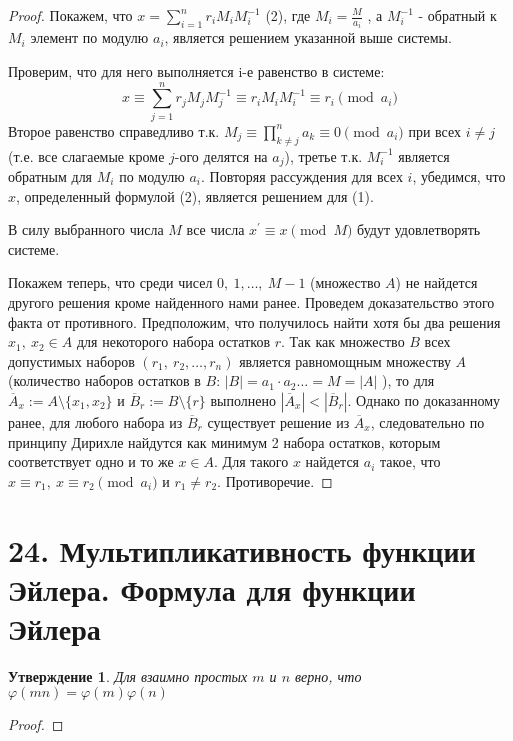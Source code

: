 \documentclass[a4paper,12pt]{article}
\newtheorem*{Statements}{Утверждение}
\renewcommand{\phi}{\varphi}
\newcommand{\p}{^{\prime}}
\begin{document}
        \begin{proof}
            Покажем, что $ x=\sum _{i=1}^{n}r_{i}M_{i}M_{i}^{-1}$ (2),
            где $ M_{i}={\frac {M}{a_{i}}}$ , а $ M_{i}^{-1} $  - обратный к $ M_{i}$  элемент по модулю $a_{i}$, является решением указанной выше системы.

            Проверим, что для него выполняется i-е равенство в системе:
            $$ x\equiv \sum _{j=1}^{n} r_{j} M_{j} M_{j}^{-1}
                \equiv r_{i}M_{i} M_{i}^{-1}
                \equiv r_{i}{\pmod {a_{i}}} $$
            Второе равенство справедливо т.к.
            $ M_{j}\equiv \prod_{k\neq j}^{n} a_{k}
                    \equiv 0{\pmod {a_{i}}}$
            при всех $ i\neq j$ (т.е. все слагаемые кроме $j$-ого делятся на $a_j$), третье т.к. $ M_{i}^{-1} $ является обратным для $ M_{i} $ по модулю $a_{i} $. Повторяя рассуждения для всех $i$, убедимся, что $x$, определенный формулой (2), является решением для (1).

            В силу выбранного числа $M$ все числа $x\p\equiv x{\pmod  M}$ будут удовлетворять системе.

            Покажем теперь, что среди чисел $0,\ 1, \dots,\ M-1$ (множество $A$) не найдется другого решения кроме найденного нами ранее.
            Проведем доказательство этого факта от противного.
            Предположим, что получилось найти хотя бы два решения $x_{1},\ x_{2}\in A$ для некоторого набора остатков $r$. Так как множество $B$ всех допустимых наборов
            $ (r_{1},\ r_{2},\dots ,r_{n}) $ является равномощным множеству $ A $ (количество наборов остатков в $B$: $|B| = a_1 \cdot a_2 \ldots = M = |A|$ ),
            то для $\overline A_{x}:=A\setminus \{x_{1},x_{2}\} $
            и
            $ \overline B_{r}:=B\setminus \{r\}$ выполнено
            $|\overline A_{x}|<|\overline B_{r}|$. Однако по доказанному ранее,
            для любого набора из $ \overline B_{r} $ существует решение из $ \overline A_{x}$, следовательно по принципу Дирихле найдутся как минимум 2 набора остатков, которым соответствует одно и то же $x\in A$. Для такого $ x $ найдется $ a_{i} $ такое, что
            $x\equiv r_{1},\ x\equiv r_{2}{\pmod  {a_{i}}}$ и $r_{1}\neq r_{2}$. Противоречие.

        \end{proof}

        \section*{24. Мультипликативность функции Эйлера. Формула для функции Эйлера}
        \begin{Statements}
            Для взаимно простых $m$ и $n$ верно, что $\phi(mn) = \phi(m)\phi(n)$
        \end{Statements}
        \begin{proof}

        \end{proof}
\end{document}
